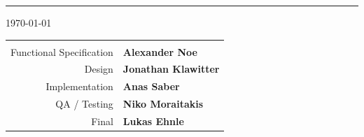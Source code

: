 \begin{titlepage}
\begin{center}
\vspace*{7cm}

{\color{PineGreen}\hrule}
\vspace*{0.4cm}
 {\today}
 
\vspace*{0.5cm}
\normalsize



\begin{tabular}{r l}

\arrayrulecolor{PineGreen!90}
\hline
& \\
 
  	Functional Specification
&
	\textbf{Alexander Noe}
\\ 
	Design
& 
	\textbf{Jonathan Klawitter}
\\ 
	Implementation 
& 
	\textbf{Anas Saber}
\\
	QA / Testing 
&
	\textbf{Niko Moraitakis}
\\
	Final 
&	\textbf{Lukas Ehnle}\\



 
\end{tabular}


\end{center}
\end{titlepage}